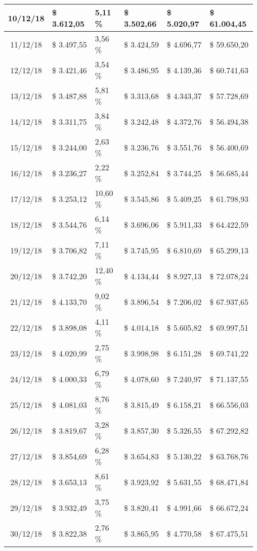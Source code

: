 \begin{small}
\begin{longtable}{|c|l|l|l|l|l|}
10/12/18 & \$ 3.612,05 & 5,11 \% & \$ 3.502,66 & \$ 5.020,97 & \$ 61.004,45 \\ \hline
11/12/18 & \$ 3.497,55 & 3,56 \% & \$ 3.424,59 & \$ 4.696,77 & \$ 59.650,20 \\ \hline
12/12/18 & \$ 3.421,46 & 3,54 \% & \$ 3.486,95 & \$ 4.139,36 & \$ 60.741,63 \\ \hline
13/12/18 & \$ 3.487,88 & 5,81 \% & \$ 3.313,68 & \$ 4.343,37 & \$ 57.728,69 \\ \hline
14/12/18 & \$ 3.311,75 & 3,84 \% & \$ 3.242,48 & \$ 4.372,76 & \$ 56.494,38 \\ \hline
15/12/18 & \$ 3.244,00 & 2,63 \% & \$ 3.236,76 & \$ 3.551,76 & \$ 56.400,69 \\ \hline
16/12/18 & \$ 3.236,27 & 2,22 \% & \$ 3.252,84 & \$ 3.744,25 & \$ 56.685,44 \\ \hline
17/12/18 & \$ 3.253,12 & 10,60 \% & \$ 3.545,86 & \$ 5.409,25 & \$ 61.798,93 \\ \hline
18/12/18 & \$ 3.544,76 & 6,14 \% & \$ 3.696,06 & \$ 5.911,33 & \$ 64.422,59 \\ \hline
19/12/18 & \$ 3.706,82 & 7,11 \% & \$ 3.745,95 & \$ 6.810,69 & \$ 65.299,13 \\ \hline
20/12/18 & \$ 3.742,20 & 12,40 \% & \$ 4.134,44 & \$ 8.927,13 & \$ 72.078,24 \\ \hline
21/12/18 & \$ 4.133,70 & 9,02 \% & \$ 3.896,54 & \$ 7.206,02 & \$ 67.937,65 \\ \hline
22/12/18 & \$ 3.898,08 & 4,11 \% & \$ 4.014,18 & \$ 5.605,82 & \$ 69.997,51 \\ \hline
23/12/18 & \$ 4.020,99 & 2,75 \% & \$ 3.998,98 & \$ 6.151,28 & \$ 69.741,22 \\ \hline
24/12/18 & \$ 4.000,33 & 6,79 \% & \$ 4.078,60 & \$ 7.240,97 & \$ 71.137,55 \\ \hline
25/12/18 & \$ 4.081,03 & 8,76 \% & \$ 3.815,49 & \$ 6.158,21 & \$ 66.556,03 \\ \hline
26/12/18 & \$ 3.819,67 & 3,28 \% & \$ 3.857,30 & \$ 5.326,55 & \$ 67.292,82 \\ \hline
27/12/18 & \$ 3.854,69 & 6,28 \% & \$ 3.654,83 & \$ 5.130,22 & \$ 63.768,76 \\ \hline
28/12/18 & \$ 3.653,13 & 8,61 \% & \$ 3.923,92 & \$ 5.631,55 & \$ 68.471,84 \\ \hline
29/12/18 & \$ 3.932,49 & 3,75 \% & \$ 3.820,41 & \$ 4.991,66 & \$ 66.672,24 \\ \hline
30/12/18 & \$ 3.822,38 & 2,76 \% & \$ 3.865,95 & \$ 4.770,58 & \$ 67.475,51 \\ \hline

\end{longtable}
\end{small}
